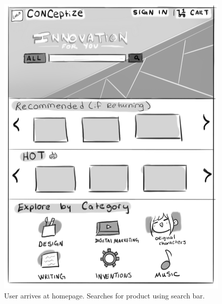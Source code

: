 \documentclass[]{article}
\begin{document}
\begin{enumerate}
\begin{figure}
		  \includegraphics[width=\linewidth]{./pictures/homepage.png}
		  \caption{User arrives at homepage. Searches for product using search bar.}
		  \label{fig:buyer1}
		\end{figure}
		

\end{enumerate}
\end{document}
